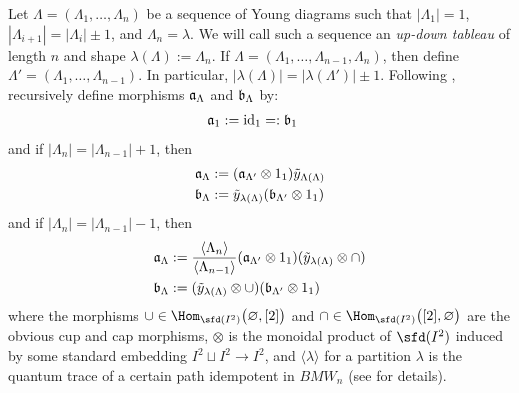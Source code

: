 Let $\Lambda = (\Lambda_1, \dots, \Lambda_n)$ be a sequence of Young diagrams such that $|\Lambda_1|=1$, $|\Lambda_{i+1}| = |\Lambda_{i}| \pm 1$, and $\Lambda_n=\lambda$. 
We will call such a sequence an \textit{up-down tableau} of length $n$ and shape $\lambda(\Lambda) := \Lambda_n$. 
If $\Lambda = (\Lambda_1, \dots, \Lambda_{n-1}, \Lambda_n)$, then define $\Lambda' = (\Lambda_1, \dots, \Lambda_{n-1})$. 
In particular, $|\lambda(\Lambda)| = |\lambda(\Lambda')| \pm 1$. Following , recursively define morphisms $\mathfrak{a}_\Lambda$ and $\mathfrak{b}_\Lambda$ by:
\begin{align*}
    \mathfrak{a}_1 &:= {\rm{id}}_1 =: \mathfrak{b}_1 
\end{align*}
and if $|\Lambda_n| = |\Lambda_{n-1}| + 1$, then 
\begin{align*}
    \mathfrak{a}_\Lambda &:= (\mathfrak{a}_{\Lambda'} \otimes 1_1) \tilde{y}_{\Lambda(\Lambda)} \\
    \mathfrak{b}_\Lambda &:= \tilde{y}_{\lambda(\Lambda)} (\mathfrak{b}_{\Lambda'} \otimes 1_1)
\end{align*}
and if $|\Lambda_n| = |\Lambda_{n-1}| - 1$, then
\begin{align*}
    \mathfrak{a}_\Lambda &:= \frac{ \langle \Lambda_n \rangle}{ \langle \Lambda_{n-1} \rangle} (\mathfrak{a}_{\Lambda'} \otimes 1_1) (\tilde{y}_{\lambda(\Lambda)} \otimes \cap) \\
    \mathfrak{b}_\Lambda &:= (\tilde{y}_{\lambda(\Lambda)} \otimes \cup) (\mathfrak{b}_{\Lambda'} \otimes 1_1)
\end{align*}
where the morphisms $\cup \in \Hom_{\sfd(I^2)} \big( \varnothing, [2] \big)$ and $\cap \in \Hom_{\sfd(I^2)} \big( [2], \varnothing \big)$ are the obvious cup and cap morphisms, $\otimes$ is the monoidal product of $\sfd(I^2)$ induced by some standard embedding $I^2 \sqcup I^2 \to I^2$, and $\langle \lambda \rangle$ for a partition $\lambda$ is the quantum trace of a certain path idempotent in $BMW_n$ (see  for details). 

